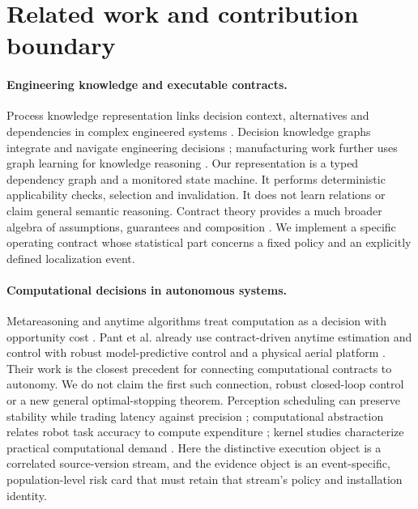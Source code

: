 \section{Related work and contribution boundary}\label{sec:related}
\paragraph{Engineering knowledge and executable contracts.}
Process knowledge representation links decision context, alternatives and dependencies in complex engineered systems \cite{wang2021process}. Decision knowledge graphs integrate and navigate engineering decisions \cite{hao2021knowledge}; manufacturing work further uses graph learning for knowledge reasoning \cite{su2025manufacturing}. Our representation is a typed dependency graph and a monitored state machine. It performs deterministic applicability checks, selection and invalidation. It does not learn relations or claim general semantic reasoning. Contract theory provides a much broader algebra of assumptions, guarantees and composition \cite{benveniste2018contracts}. We implement a specific operating contract whose statistical part concerns a fixed policy and an explicitly defined localization event.

\paragraph{Computational decisions in autonomous systems.}
Metareasoning and anytime algorithms treat computation as a decision with opportunity cost \cite{russell1991meta,zilberstein1996anytime,hay2012}. Pant et al. already use contract-driven anytime estimation and control with robust model-predictive control and a physical aerial platform \cite{pant2021}. Their work is the closest precedent for connecting computational contracts to autonomy. We do not claim the first such connection, robust closed-loop control or a new general optimal-stopping theorem. Perception scheduling can preserve stability while trading latency against precision \cite{aldana2023}; computational abstraction relates robot task accuracy to compute expenditure \cite{ghosh2021}; kernel studies characterize practical computational demand \cite{sifat2023}. Here the distinctive execution object is a correlated source-version stream, and the evidence object is an event-specific, population-level risk card that must retain that stream's policy and installation identity.

